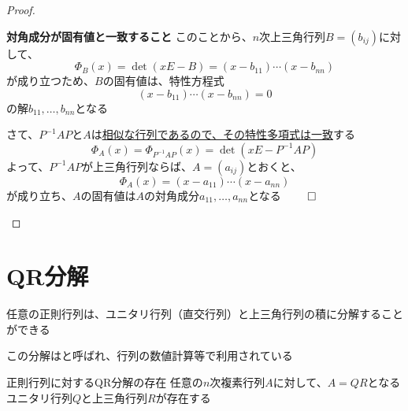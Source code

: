 \documentclass[../../../topic_linear-algebra]{subfiles}
\begin{document}
\begin{proof}
\begin{subpattern}{\bfseries 対角成分が固有値と一致すること}
    このことから、$n$次上三角行列$B = (b_{ij})$に対して、
    \begin{equation*}
      \Phi_B(x) = \det(xE - B) = (x-b_{11})\cdots (x-b_{nn})
    \end{equation*}
    が成り立つため、$B$の固有値は、特性方程式
    \begin{equation*}
      (x-b_{11})\cdots (x-b_{nn}) = 0
    \end{equation*}
    の解$b_{11},\ldots,b_{nn}$となる

    \br

    さて、$P^{-1}AP$と$A$は\hyperref[thm:char-poly-of-similar-matrices]{相似な行列であるので、その特性多項式は一致}する
    \begin{equation*}
      \Phi_A(x) = \Phi_{P^{-1}AP}(x) = \det(xE - P^{-1}AP)
    \end{equation*}
    よって、$P^{-1}AP$が上三角行列ならば、$A = (a_{ij})$とおくと、
    \begin{equation*}
      \Phi_A(x) = (x - a_{11})\cdots (x - a_{nn})
    \end{equation*}
    が成り立ち、$A$の固有値は$A$の対角成分$a_{11},\ldots,a_{nn}$となる $\qed$
  \end{subpattern}
\end{proof}

\sectionline
\section{QR分解}

任意の正則行列は、ユニタリ行列（直交行列）と上三角行列の積に分解することができる

この分解はと呼ばれ、行列の数値計算等で利用されている

\begin{theorem*}{正則行列に対するQR分解の存在}
  任意の$n$次複素行列$A$に対して、$A=QR$となるユニタリ行列$Q$と上三角行列$R$が存在する
\end{theorem*}
\end{document}
